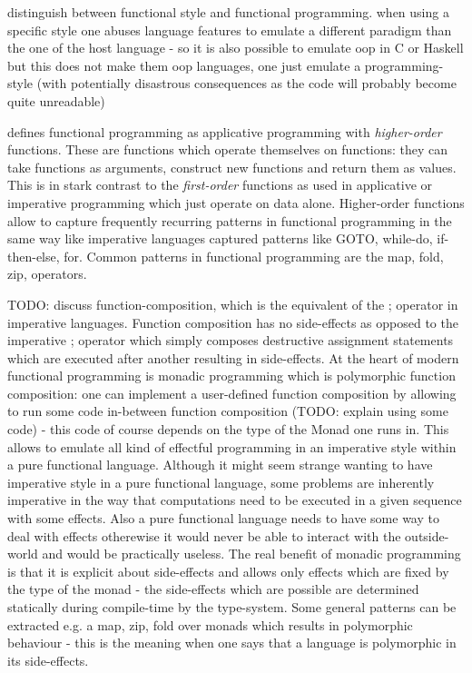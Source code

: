 distinguish between functional style and functional programming. when using a specific style one abuses language features to emulate a different paradigm than the one of the host language - so it is also possible to emulate oop in C or Haskell but this does not make them oop languages, one just emulate a programming-style (with potentially disastrous consequences as the code will probably become quite unreadable)

\cite{maclennan_functional_1990} defines functional programming as applicative programming with \textit{higher-order} functions. These are functions which operate themselves on functions: they can take functions as arguments, construct new functions and return them as values. This is in stark contrast to the \textit{first-order} functions as used in applicative or imperative programming which just operate on data alone.
Higher-order functions allow to capture frequently recurring patterns in functional programming in the same way like imperative languages captured patterns like GOTO, while-do, if-then-else, for. Common patterns in functional programming are the map, fold, zip, operators.

TODO: discuss function-composition, which is the equivalent of the ; operator in imperative languages. Function composition has no side-effects as opposed to the imperative ; operator which simply composes destructive assignment statements which are executed after another resulting in side-effects.
At the heart of modern functional programming is monadic programming which is polymorphic function composition: one can implement a user-defined function composition by allowing to run some code in-between function composition (TODO: explain using some code) - this code of course depends on the type of the Monad one runs in. This allows to emulate all kind of effectful programming in an imperative style within a pure functional language. Although it might seem strange wanting to have imperative style in a pure functional language, some problems are inherently imperative in the way that computations need to be executed in a given sequence with some effects. Also a pure functional language needs to have some way to deal with effects otherewise it would never be able to interact with the outside-world and would be practically useless. The real benefit of monadic programming is that it is explicit about side-effects and allows only effects which are fixed by the type of the monad - the side-effects which are possible are determined statically during compile-time by the type-system. Some general patterns can be extracted e.g. a map, zip, fold over monads which results in polymorphic behaviour - this is the meaning when one says that a language is polymorphic in its side-effects.

